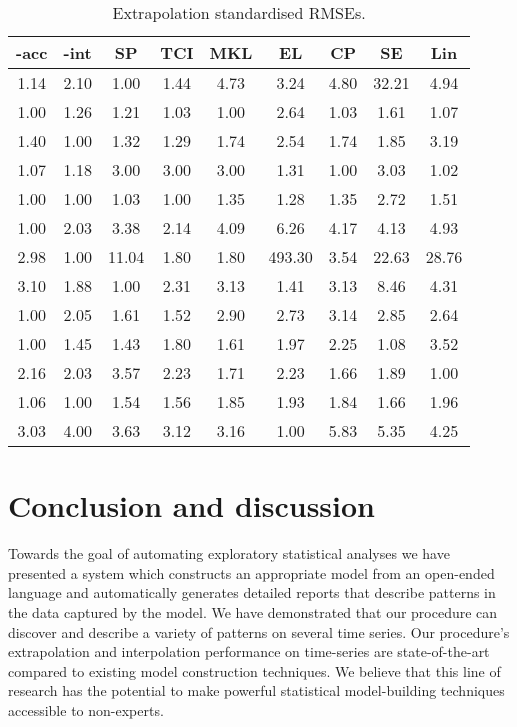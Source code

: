 \begin{table}[ht]
\center
\begin{tabular}{|c|c|c|c|c|c|c|c|c|}
\hline
\procedurename{}-acc & \procedurename{}-int & SP & TCI & MKL & EL & CP & SE & Lin \\
\hline
1.14 & 2.10 & 1.00 & 1.44 & 4.73 & 3.24 & 4.80 & 32.21 & 4.94\\
1.00 & 1.26 & 1.21 & 1.03 & 1.00 & 2.64 & 1.03 & 1.61 & 1.07\\
1.40 & 1.00 & 1.32 & 1.29 & 1.74 & 2.54 & 1.74 & 1.85 & 3.19\\
1.07 & 1.18 & 3.00 & 3.00 & 3.00 & 1.31 & 1.00 & 3.03 & 1.02\\
1.00 & 1.00 & 1.03 & 1.00 & 1.35 & 1.28 & 1.35 & 2.72 & 1.51\\
1.00 & 2.03 & 3.38 & 2.14 & 4.09 & 6.26 & 4.17 & 4.13 & 4.93\\
2.98 & 1.00 & 11.04 & 1.80 & 1.80 & 493.30 & 3.54 & 22.63 & 28.76\\
3.10 & 1.88 & 1.00 & 2.31 & 3.13 & 1.41 & 3.13 & 8.46 & 4.31\\
1.00 & 2.05 & 1.61 & 1.52 & 2.90 & 2.73 & 3.14 & 2.85 & 2.64\\
1.00 & 1.45 & 1.43 & 1.80 & 1.61 & 1.97 & 2.25 & 1.08 & 3.52\\
2.16 & 2.03 & 3.57 & 2.23 & 1.71 & 2.23 & 1.66 & 1.89 & 1.00\\
1.06 & 1.00 & 1.54 & 1.56 & 1.85 & 1.93 & 1.84 & 1.66 & 1.96\\
3.03 & 4.00 & 3.63 & 3.12 & 3.16 & 1.00 & 5.83 & 5.35 & 4.25\\
\hline
\end{tabular}
\caption{Extrapolation standardised RMSEs.}
\label{table:extrap}
\end{table}

\section{Conclusion and discussion}
\label{sec:description:discussion}

Towards the goal of automating exploratory statistical analyses we have presented a system which constructs an appropriate model from an open-ended language and automatically generates detailed reports that describe patterns in the data captured by the model.
We have demonstrated that our procedure can discover and describe a variety of patterns on several time series.
Our procedure's extrapolation and interpolation performance on time-series are state-of-the-art compared to existing model construction techniques.
We believe that this line of research has the potential to make powerful statistical model-building techniques accessible to non-experts.

